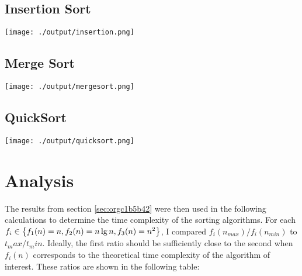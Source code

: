 \documentclass[11pt]{article}
\let\originalleft\left
\let\originalright\right
\renewcommand{\left}{\mathopen{}\mathclose\bgroup\originalleft}
\renewcommand{\right}{\aftergroup\egroup\originalright}
\begin{document}
\subsection{Insertion Sort}
\label{sec:orgae10026}
\begin{center}
\texttt{[image: ./output/insertion.png]}
\end{center}

\subsection{Merge Sort}
\label{sec:orgaffa08f}
\begin{center}
\texttt{[image: ./output/mergesort.png]}
\end{center}

\subsection{QuickSort}
\label{sec:org8dd3665}
\begin{center}
\texttt{[image: ./output/quicksort.png]}
\end{center}

\section{Analysis}
\label{sec:org07f3f45}

The results from section \ref{sec:orgc1b5b42} were then used in the following calculations to determine the
time complexity of the sorting algorithms. For each
\(f_i \in \left\{ f_1(n) = n, f_2(n) = n \lg n, f_3(n) = n^2 \right\}\),
I compared \(f_i(n_{max})/f_i(n_{min})\) to \(t_max/t_min\). Ideally, the first ratio should
be sufficiently close to the second when \(f_i(n)\) corresponds to the theoretical time complexity
of the algorithm of interest. These ratios are shown in the following table:
\end{document}

